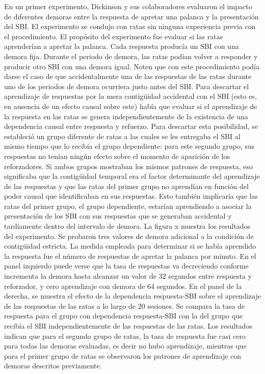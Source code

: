 \documentclass[
  letterpaper,
]{book}
\begin{document}
En un primer experimento, Dickinson y sus colaboradores evaluaron el
impacto de diferentes demoras entre la respuesta de apretar una palanca
y la presentación del SBI. El experimento se condujo con ratas sin
ninguna experiencia previa con el procedimiento. El propósito del
experimento fue evaluar si las ratas aprenderían a apretar la palanca.
Cada respuesta producía un SBI con una demora fija. Durante el periodo
de demora, las ratas podían volver a responder y producir otro SBI con
una demora igual. Noten que con este procedimiento podía darse el caso
de que accidentalmente una de las respuestas de las ratas durante uno de
los periodos de demora ocurriera justo antes del SBI. Para descartar el
aprendizaje de respuestas por la mera contigüidad accidental con el SBI
(esto es, en ausencia de un efecto causal sobre este) había que evaluar
si el aprendizaje de la respuesta en las ratas se genera
independientemente de la existencia de una dependencia causal entre
respuesta y refuerzo. Para descartar esta posibilidad, se estableció un
grupo diferente de ratas a las cuales se les entregaba el SBI al mismo
tiempo que lo recibía el grupo dependiente: para este segundo grupo, sus
respuestas no tenían ningún efecto sobre el momento de aparición de los
reforzadores. Si ambos grupos mostraban los mismos patrones de
respuesta, eso significaba que la contigüidad temporal era el factor
determinante del aprendizaje de las respuestas y que las ratas del
primer grupo no aprendían en función del poder causal que identificaban
en sus respuestas. Esto también implicaría que las ratas del primer
grupo, el grupo dependiente, estarían aprendiendo a asociar la
presentación de los SBI con sus respuestas que se generaban accidental y
tardíamente dentro del intervalo de demora. La figura x muestra los
resultados del experimento. Se probaron tres valores de demora adicional
a la condición de contigüidad estricta. La medida empleada para
determinar si se había aprendido la respuesta fue el número de
respuestas de apretar la palanca por minuto. En el panel izquierdo puede
verse que la tasa de respuestas va decreciendo conforme incrementa la
demora hasta alcanzar un valor de 32 segundos entre respuesta y
reforzador, y cero aprendizaje con demora de 64 segundos. En el panel de
la derecha, se muestra el efecto de la dependencia respuesta-SBI sobre
el aprendizaje de las respuestas de las ratas a lo largo de 20 sesiones.
Se compara la tasa de respuesta para el grupo con dependencia
respuesta-SBI con la del grupo que recibía el SBI independientemente de
las respuestas de las ratas. Los resultados indican que para el segundo
grupo de ratas, la tasa de respuesta fue casi cero para todas las
demoras evaluadas, es decir no hubo aprendizaje, mientras que para el
primer grupo de ratas se observaron los patrones de aprendizaje con
demoras descritos previamente.
\end{document}
